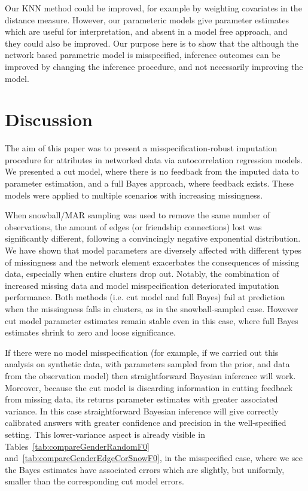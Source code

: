 \documentclass{article}
\begin{document}
Our KNN method could be improved, for example by weighting covariates in the distance measure. However, our parameteric models give parameter estimates which are useful for interpretation, and absent in a model free approach, and they could also be improved. Our purpose here is to show that the although the network based parametric model is misspecified, inference outcomes can be improved by changing the inference procedure, and not necessarily improving the model.


\section{Discussion}
The aim of this paper was to present a misspecification-robust imputation procedure for attributes in networked data via autocorrelation regression models. We presented a cut model, where there is no feedback from the imputed data to parameter estimation, and a full Bayes approach, where feedback exists. These models were applied to multiple scenarios with increasing missingness.

When snowball/MAR sampling was used to remove the same number of observations, the amount of edges (or friendship connections) lost was significantly different, following a convincingly negative exponential distribution. We have shown that model parameters are diversely affected with different types of missingness and the network element exacerbates the consequences of missing data, especially when entire clusters drop out. Notably, the combination of increased missing data and model misspecification deteriorated imputation performance. 
Both methods (i.e. cut model and full Bayes) fail at prediction when the missingness falls in clusters, as in the snowball-sampled case. However cut model parameter estimates remain stable even in this case, where full Bayes estimates shrink to zero and loose significance.

If there were no model misspecification (for example, if we carried out this analysis on synthetic data, with parameters sampled from the prior, and data from the observation model) then straightforward Bayesian inference will
work. Moreover, because the cut model is discarding information in cutting feedback from
missing data, its returns parameter estimates with greater associated variance. In this case straightforward Bayesian inference will give correctly calibrated answers with greater confidence and precision in the well-specified setting. This lower-variance aspect is already visible in Tables~\ref{tab:compareGenderRandomF0} and~\ref{tab:compareGenderEdgeCorSnowF0}, in the misspecified case,
where we see the Bayes estimates have associated errors which are slightly, but uniformly, smaller than the corresponding cut model errors.
\end{document}
